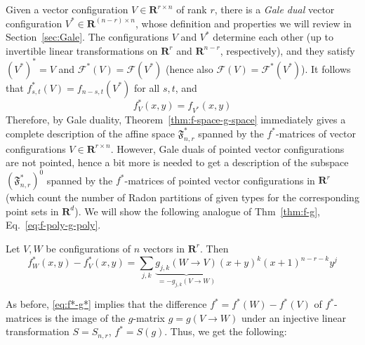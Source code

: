 \documentclass[a4paper,USenglish,cleveref, autoref, thm-restate,nolineno]{socg-lipics-v2021}
\newcommand{\fspace}{\mathfrak{F}}
\newcommand{\R}{\mathbf{R}}
\begin{document}
Given a vector configuration $V \in \R^{r\times n}$ of rank $r$, there is a \emph{Gale dual} vector configuration $V^*  \in \R^{(n-r)\times n}$, whose definition and properties we will review in Section~\ref{sec:Gale}. The configurations $V$ and $V^*$ determine each other (up to invertible linear transformations on $\R^r$ and $\R^{n-r}$, respectively), and they satisfy 
$(V^*)^*=V$ and $\mathcal{F}^*(V)=\mathcal{F}(V^*)$ (hence also $\mathcal{F}(V)=\mathcal{F}^*(V^*)$). It follows that
$f^*_{s,t}(V)=f_{n-s,t}(V^*)$ for all $s,t$, and 
\[
f^*_V(x,y)=f_{V^*}(x,y)
\]
Therefore, by Gale duality, Theorem~\ref{thm:f-space-g-space} immediately gives a complete description of the affine space 
$\fspace^*_{n,r}$ spanned by the $f^*$-matrices of vector configurations $V\in \R^{r\times n}$. However, Gale duals of pointed vector configurations are not pointed, hence a bit more is needed to get a description of the subspace 
$(\fspace^*_{n,r})^0$ spanned by the $f^*$-matrices of pointed vector configurations in $\R^r$ (which count the number of Radon partitions of given types for the corresponding point sets in $\R^d$). We will show the following analogue of Thm~\ref{thm:f-g}, Eq.~\eqref{eq:f-poly-g-poly}.

\begin{theorem}
\label{thm:f*-g*}
Let $V,W$ be configurations of $n$ vectors in $\R^r$. Then
\begin{equation}
\label{eq:f*-g*}
f^*_W(x,y) - f^*_{V}(x,y)= \sum_{j,k} \underbrace{g_{j,k}(W \to V)}_{=-g_{j,k}(V \to W)} (x+y)^k (x+1)^{n-r-k} y^j
\end{equation}
\end{theorem}
As before, \eqref{eq:f*-g*} implies that the difference $f^*=f^*(W)-f^*(V)$ of $f^*$-matrices is the image of the $g$-matrix $g=g(V\to W)$ under an injective linear transformation $S=S_{n,r}$, $f^*=S(g)$. Thus, we get the following:
\end{document}
